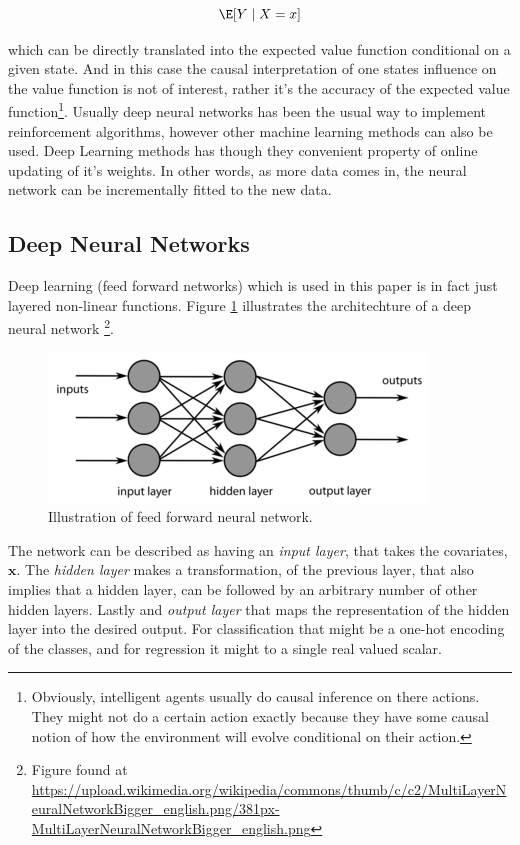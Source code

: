 \begin{equation}
    \E[Y \mid X=x]
\end{equation}

which can be directly translated into the expected value function conditional on a given state. And in this case the causal interpretation of one states influence on the value function is not of interest, rather it's the accuracy of the expected value function\footnote{Obviously, intelligent agents usually do causal inference on there actions. They might not do a certain action exactly because they have some causal notion of how the environment will evolve conditional on their action.}. Usually deep neural networks has been the usual way to implement reinforcement algorithms, however other machine learning methods can also be used. Deep Learning methods has though they convenient property of online updating of it's weights. In other words, as more data comes in, the neural network can be incrementally fitted to the new data.

\subsection{Deep Neural Networks}

Deep learning (feed forward networks) which is used in this paper is in fact just layered non-linear functions. Figure \ref{fig:feedforwardnetwork} illustrates the architechture of a deep neural network \footnote{Figure found at \url{https://upload.wikimedia.org/wikipedia/commons/thumb/c/c2/MultiLayerNeuralNetworkBigger_english.png/381px-MultiLayerNeuralNetworkBigger_english.png}}.

\begin{figure}[ht]
    \centering
    \includegraphics[scale=0.6]{figures/feedforwardnetworkillustration.png}
    \caption{Illustration of feed forward neural network. }
    \label{fig:feedforwardnetwork}
\end{figure}

The network can be described as having an \textit{input layer}, that takes the covariates, $\textbf{x}$. The \textit{hidden layer} makes a transformation, of the previous layer, that also implies that a hidden layer, can be followed by an arbitrary number of other hidden layers. Lastly and \textit{output layer} that maps the representation of the hidden layer into the desired output. For classification that might be a one-hot encoding of the classes, and for regression it might to a single real valued scalar.

